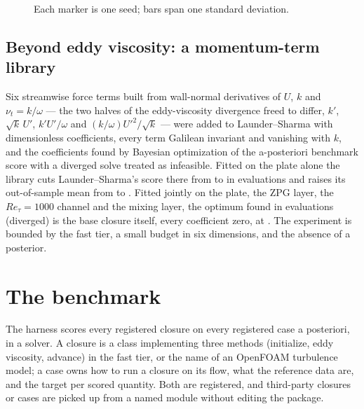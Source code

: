 \documentclass[lineno]{jfm}
\begin{document}
\begin{figure}
  \centerline{}
  \caption{Each marker is one seed; bars span one standard deviation.}
  \label{fig:noise}
\end{figure}

\subsection{Beyond eddy viscosity: a momentum-term library}\label{sec:momentum-library}

Six streamwise force terms built from wall-normal derivatives of $U$, $k$
and $\nu_t = k/\omega$ --- the two halves of the eddy-viscosity divergence
freed to differ, $k'$, $\sqrt{k}\,U'$, $k'U'/\omega$ and
$(k/\omega)U'^2/\sqrt{k}$ --- were added to Launder--Sharma with
dimensionless coefficients, every term Galilean invariant and vanishing with
$k$, and the coefficients found by Bayesian optimization of the
a-posteriori benchmark score with a diverged solve treated as infeasible.
Fitted on the plate alone the library cuts Launder--Sharma's score there
from  to
 in
 evaluations and raises its
out-of-sample mean from
 to
. Fitted jointly on
the plate, the ZPG layer, the $Re_\tau = 1000$ channel and the mixing
layer, the optimum found in 
evaluations ( diverged) is the
base closure itself, every coefficient zero, at
. The experiment is bounded
by the fast tier, a small budget in six dimensions, and the absence of a
posterior.

\section{The benchmark}\label{sec:gym}

The harness scores every registered closure on every registered case a
posteriori, in a solver. A closure is a class implementing three methods
(initialize, eddy viscosity, advance) in the fast tier, or the name of an
OpenFOAM turbulence model; a case owns how to run a closure on its flow,
what the reference data are, and the target per scored quantity. Both are
registered, and third-party closures or cases are picked up from a named
module without editing the package.
\end{document}
